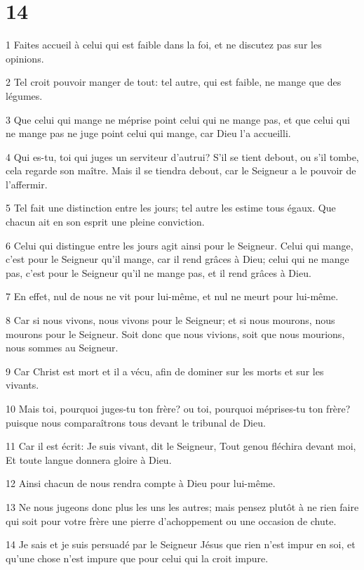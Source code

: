 \chapter{14}

\par 1 Faites accueil à celui qui est faible dans la foi, et ne discutez pas sur les opinions.
\par 2 Tel croit pouvoir manger de tout: tel autre, qui est faible, ne mange que des légumes.
\par 3 Que celui qui mange ne méprise point celui qui ne mange pas, et que celui qui ne mange pas ne juge point celui qui mange, car Dieu l'a accueilli.
\par 4 Qui es-tu, toi qui juges un serviteur d'autrui? S'il se tient debout, ou s'il tombe, cela regarde son maître. Mais il se tiendra debout, car le Seigneur a le pouvoir de l'affermir.
\par 5 Tel fait une distinction entre les jours; tel autre les estime tous égaux. Que chacun ait en son esprit une pleine conviction.
\par 6 Celui qui distingue entre les jours agit ainsi pour le Seigneur. Celui qui mange, c'est pour le Seigneur qu'il mange, car il rend grâces à Dieu; celui qui ne mange pas, c'est pour le Seigneur qu'il ne mange pas, et il rend grâces à Dieu.
\par 7 En effet, nul de nous ne vit pour lui-même, et nul ne meurt pour lui-même.
\par 8 Car si nous vivons, nous vivons pour le Seigneur; et si nous mourons, nous mourons pour le Seigneur. Soit donc que nous vivions, soit que nous mourions, nous sommes au Seigneur.
\par 9 Car Christ est mort et il a vécu, afin de dominer sur les morts et sur les vivants.
\par 10 Mais toi, pourquoi juges-tu ton frère? ou toi, pourquoi méprises-tu ton frère? puisque nous comparaîtrons tous devant le tribunal de Dieu.
\par 11 Car il est écrit: Je suis vivant, dit le Seigneur, Tout genou fléchira devant moi, Et toute langue donnera gloire à Dieu.
\par 12 Ainsi chacun de nous rendra compte à Dieu pour lui-même.
\par 13 Ne nous jugeons donc plus les uns les autres; mais pensez plutôt à ne rien faire qui soit pour votre frère une pierre d'achoppement ou une occasion de chute.
\par 14 Je sais et je suis persuadé par le Seigneur Jésus que rien n'est impur en soi, et qu'une chose n'est impure que pour celui qui la croit impure.
